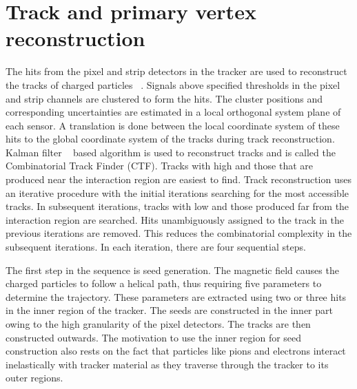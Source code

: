 \section{Track and primary vertex reconstruction}
\label{track_recon}

The hits from the pixel and strip detectors in the tracker are used to reconstruct the tracks of charged particles ~\cite{Chatrchyan:2014fea}. Signals above specified thresholds in the pixel and strip channels are clustered to form the hits. The cluster positions and corresponding uncertainties are estimated in a local orthogonal system plane of each sensor. A translation is done between the local coordinate system of these hits to the global coordinate system of the tracks during track reconstruction. Kalman filter ~\cite{Fruhwirth:1987fm} based algorithm is used to reconstruct tracks and is called the Combinatorial Track Finder (CTF). Tracks with high \pt and those that are produced near the interaction region are easiest to find. Track reconstruction uses an iterative procedure with the initial iterations searching for the most accessible tracks. In subsequent iterations, tracks with low \pt and those produced far from the interaction region are searched. Hits unambiguously assigned to the track in the previous iterations are removed. This reduces the combinatorial complexity in the subsequent iterations. In each iteration, there are four sequential steps.

The first step in the sequence is seed generation. The magnetic field causes the charged particles to follow a helical path, thus requiring five parameters to determine the trajectory. These parameters are extracted using two or three hits in the inner region of the tracker. The seeds are constructed in the inner part owing to the high granularity of the pixel detectors. The tracks are then constructed outwards. The motivation to use the inner region for seed construction also rests on the fact that particles like pions and electrons interact inelastically with tracker material as they traverse through the tracker to its outer regions.

